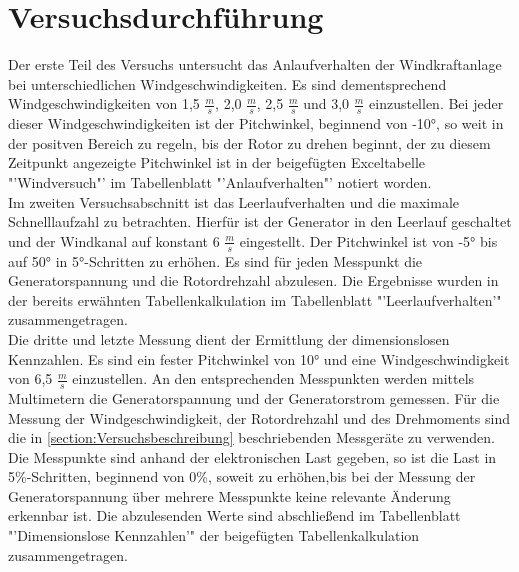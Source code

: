 \section{Versuchsdurchführung}
\label{section:Versuchsdurchführung}
Der erste Teil des Versuchs untersucht das Anlaufverhalten der Windkraftanlage bei unterschiedlichen Windgeschwindigkeiten.
Es sind dementsprechend Windgeschwindigkeiten von 1,5 $\frac{m}{s}$, 2,0 $\frac{m}{s}$, 2,5 $\frac{m}{s}$ und 3,0 $\frac{m}{s}$ einzustellen.
Bei jeder dieser Windgeschwindigkeiten ist der Pitchwinkel, beginnend von -10°, so weit in der positven Bereich zu regeln, bis der Rotor zu drehen beginnt, der zu diesem Zeitpunkt angezeigte Pitchwinkel ist in der beigefügten Exceltabelle "'Windversuch"' im Tabellenblatt "'Anlaufverhalten"' notiert worden.\\
Im zweiten Versuchsabschnitt ist das Leerlaufverhalten und die maximale Schnelllaufzahl zu betrachten.
Hierfür ist der Generator in den Leerlauf geschaltet und der Windkanal auf konstant 6 $\frac{m}{s}$ eingestellt.
Der Pitchwinkel ist von -5° bis auf 50° in 5°-Schritten zu erhöhen.
Es sind für jeden Messpunkt die Generatorspannung und die Rotordrehzahl abzulesen.
Die Ergebnisse wurden in der bereits erwähnten Tabellenkalkulation im Tabellenblatt "'Leerlaufverhalten'" zusammengetragen.\\
Die dritte und letzte Messung dient der Ermittlung der dimensionslosen Kennzahlen.
Es sind ein fester Pitchwinkel von 10° und eine Windgeschwindigkeit von 6,5 $\frac{m}{s}$ einzustellen.
An den entsprechenden Messpunkten werden mittels Multimetern die Generatorspannung und der Generatorstrom gemessen.
Für die Messung der Windgeschwindigkeit, der Rotordrehzahl und des Drehmoments sind die in \autoref{section:Versuchsbeschreibung} beschriebenden Messgeräte zu verwenden.
Die Messpunkte sind anhand der elektronischen Last gegeben, so ist die Last in 5\%-Schritten, beginnend von 0\%, soweit zu erhöhen,bis bei der Messung der Generatorspannung über mehrere Messpunkte keine relevante Änderung erkennbar ist.
Die abzulesenden Werte sind abschließend im Tabellenblatt "'Dimensionslose Kennzahlen'" der beigefügten Tabellenkalkulation zusammengetragen.